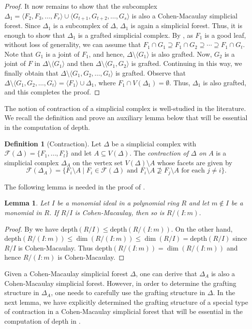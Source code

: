 \documentclass[12pt,a4paper,reqno]{amsart}
\newtheorem{lemma}[proposition]{Lemma}
\theoremstyle{definition}
\newtheorem{definition}[proposition]{Definition}
\def\D{\Delta}
\def\F{\mathcal{F}}
\def\d{\mathrm{depth}}
\def\l{\langle}
\def\r{\rangle}
\begin{document}
\begin{proof}
It now remains to show that the subcomplex $\D_1=\l F_2,F_3,\ldots , F_r\r\cup \l G_{t+1}, G_{t+2},\ldots , G_s\r$ is also a Cohen-Macaulay simplicial forest. Since $\D_1$ is a subcomplex of $\D$, $\D_1$ is again a simplicial forest. Thus, it is enough to show that $\D_1$ is a grafted simplicial complex. By , as $F_1$ is a good leaf, without loss of generality, we can assume that $F_1\cap G_1\supseteq F_1\cap G_2\supseteq \cdots \supseteq F_1\cap G_t$. Note that $G_1$ is a joint of $F_1$, and hence, $\D\setminus \l G_1\r$ is also grafted. Now, $G_2$ is a joint of $F$ in $\D\setminus \l G_1\r$ and then $\D\setminus \l G_1,G_2\r$ is grafted. Continuing in this way, we finally obtain that $\D\setminus \l G_1,G_2,\ldots , G_t\r$ is grafted. Observe that $\D\setminus \l G_1,G_2,\ldots , G_t\r=\l F_1\r\cup \D_1$, where $F_1\cap V(\D_1)=\emptyset$. Thus, $\D_1$ is also grafted, and this completes the proof.
\end{proof}


The notion of contraction of a simplicial complex is well-studied in the literature. We recall the definition and prove an auxiliary lemma below that will be essential in the computation of depth.


\begin{definition}[Contraction]
    Let $\Delta$ be a simplicial complex with $\F(\Delta)=\{F_1,\ldots,F_l\}$ and let $A\subseteq V(\Delta)$. The \textit{contraction of $\D$ on $A$} is a simplicial complex $\D_A$ on the vertex set $V(\D)\setminus A$ whose facets are given by
    \[
        \F(\D_A)=\{F_i\setminus A\mid F_i\in\F(\Delta)\text{ and } F_i\setminus A\nsupseteq F_j\setminus A\text{ for each }j\neq i \}.
    \]
\end{definition}

The following lemma is needed in the proof of .

\begin{lemma}\label{colon cohen macaulay}
    Let $I$ be a monomial ideal in a polynomial ring $R$ and let $m\notin I$ be a monomial in $R$. If $R/I$ is Cohen-Macaulay, then so is $R/(I:m)$.
\end{lemma}
\begin{proof}
    By \cite[Corollary 1.3]{Rauf2010} we have $\d(R/I)\le \d(R/(I:m))$. On the other hand, $\d(R/(I:m))\le \dim(R/(I:m))\le \dim(R/I)=\d(R/I)$ since $R/I$ is Cohen-Macaulay. Thus $\d(R/(I:m))=\dim(R/(I:m))$ and hence $R/(I:m)$ is Cohen-Macaulay.
\end{proof}
Given a Cohen-Macaulay simplicial forest $\D$, one can derive that $\D_A$ is also a Cohen-Macaulay simplicial forest. However, in order to determine the grafting structure in $\D_A$, one needs to carefully use the grafting structure in $\D$. In the next lemma, we have explicitly determined the grafting structure of a special type of contraction in a Cohen-Macaulay simplicial forest that will be essential in the computation of depth in . 
\end{document}
